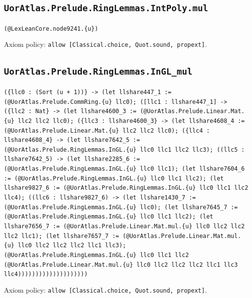 \documentclass[11pt]{article}
\begin{document}
\subsection*{\texttt{UorAtlas.Prelude.RingLemmas.IntPoly.mul}}
\noindent\texttt{(@LexLeanCore.node9241.\{u\})}\par
\noindent Axiom policy: \texttt{allow [Classical.choice, Quot.sound, propext]}.\par
\subsection*{\texttt{UorAtlas.Prelude.RingLemmas.InGL\_mul}}
\noindent\texttt{(\{llc0 : (Sort (u + 1))\} -> (let llshare447\_1 := (@UorAtlas.Prelude.CommRing.\{u\} llc0); ([llc1 : llshare447\_1] -> (\{llc2 : Nat\} -> (let llshare4600\_3 := (@UorAtlas.Prelude.Linear.Mat.\{u\} llc2 llc2 llc0); (\{llc3 : llshare4600\_3\} -> (let llshare4608\_4 := (@UorAtlas.Prelude.Linear.Mat.\{u\} llc2 llc2 llc0); (\{llc4 : llshare4608\_4\} -> (let llshare7642\_5 := (@UorAtlas.Prelude.RingLemmas.InGL.\{u\} llc0 llc1 llc2 llc3); ((llc5 : llshare7642\_5) -> (let llshare2285\_6 := (@UorAtlas.Prelude.RingLemmas.InGL.\{u\} llc0 llc1); (let llshare7604\_6 := (@UorAtlas.Prelude.RingLemmas.InGL.\{u\} llc0 llc1 llc2); (let llshare9827\_6 := (@UorAtlas.Prelude.RingLemmas.InGL.\{u\} llc0 llc1 llc2 llc4); ((llc6 : llshare9827\_6) -> (let llshare1430\_7 := (@UorAtlas.Prelude.RingLemmas.InGL.\{u\} llc0); (let llshare7645\_7 := (@UorAtlas.Prelude.RingLemmas.InGL.\{u\} llc0 llc1 llc2); (let llshare7656\_7 := (@UorAtlas.Prelude.Linear.Mat.mul.\{u\} llc0 llc2 llc2 llc2 llc1); (let llshare7657\_7 := (@UorAtlas.Prelude.Linear.Mat.mul.\{u\} llc0 llc2 llc2 llc2 llc1 llc3); (@UorAtlas.Prelude.RingLemmas.InGL.\{u\} llc0 llc1 llc2 (@UorAtlas.Prelude.Linear.Mat.mul.\{u\} llc0 llc2 llc2 llc2 llc1 llc3 llc4))))))))))))))))))))}\par
\noindent Axiom policy: \texttt{allow [Classical.choice, Quot.sound, propext]}.\par
\end{document}
